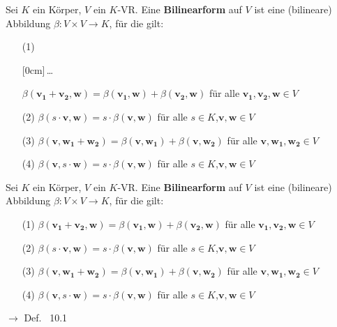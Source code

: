 \documentclass[11pt]{article}
\renewcommand{\cite}[1]{\par\bigskip\hfill{\color{gray}\tiny\(\to\) #1}}
\renewcommand{\vec}[1]{\mathbf{#1}}
\newcommand{\hide}[1]{\parbox{0cm}{\raisebox{-7pt}[0cm]{\dots}}\color{white}#1\color{black}}
\let\olddots\dots
\renewcommand{\dots}{\,\olddots\,}
\newenvironment{field}{}{\newpage}
\newif\ifnote
\newenvironment{note}{\notetrue}{\notefalse}
\newcommand{\localtag}{}
\newcommand{\globaltag}{}
\newcommand{\uuid}{}
\newcommand{\tags}[1]{
    \ifnote
        \renewcommand{\localtag}{#1}
    \else
        \renewcommand{\globaltag}{#1}
    \fi
    }
\newcommand{\xplain}[1]{\renewcommand{\uuid}{#1}}
\begin{document}

\tags{LinA-II-10-Skalarprodukte}
\begin{note}
    \xplain{6fc8a1b6-b98b-11ec-8422-0242ac120002}
    \tags{Def}
    \begin{field} %
    Sei \(K\) ein Körper, \(V\) ein \(K\)-VR. Eine \textbf{Bilinearform} auf \(V\) ist eine (bilineare) Abbildung  \(\beta\colon V\times V \to K\), für die gilt:
    \begin{itemize}
        \item[(1)] \hide{\(\beta(\vec{v_1} + \vec{v_2}, \vec{w}) = \beta(\vec{v_1}, \vec{w}) + \beta(\vec{v_2}, \vec{w})\) für alle \(\vec{v_1, v_2, w} \in V\)}
        \item[(2)] \(\beta(s\cdot\vec{v},\vec{w}) = s\cdot\beta(\vec{v},\vec{w})\) für alle \(s\in K\),\(\vec{v},\vec{w}\in V\)
        \item[(3)]\(\beta(\vec{v}, \vec{w_1} + \vec{w_2}) = \beta(\vec{v}, \vec{w_1}) + \beta(\vec{v}, \vec{w_2})\) für alle \(\vec{v, w_1, w_2} \in V\)
        \item[(4)]\(\beta(\vec{v},s\cdot\vec{w}) = s\cdot\beta(\vec{v},\vec{w})\) für alle \(s\in K\),\(\vec{v},\vec{w}\in V\)
    \end{itemize}
    \end{field}
    \begin{field} %
    Sei \(K\) ein Körper, \(V\) ein \(K\)-VR. Eine \textbf{Bilinearform} auf \(V\) ist eine (bilineare) Abbildung  \(\beta\colon V\times V \to K\), für die gilt:
    \begin{itemize}
        \item[(1)] \(\beta(\vec{v_1} + \vec{v_2}, \vec{w}) = \beta(\vec{v_1}, \vec{w}) + \beta(\vec{v_2}, \vec{w})\) für alle \(\vec{v_1, v_2, w} \in V\)
        \item[(2)] \(\beta(s\cdot\vec{v},\vec{w}) = s\cdot\beta(\vec{v},\vec{w})\) für alle \(s\in K\),\(\vec{v},\vec{w}\in V\)
        \item[(3)]\(\beta(\vec{v}, \vec{w_1} + \vec{w_2}) = \beta(\vec{v}, \vec{w_1}) + \beta(\vec{v}, \vec{w_2})\) für alle \(\vec{v, w_1, w_2} \in V\)
        \item[(4)]\(\beta(\vec{v},s\cdot\vec{w}) = s\cdot\beta(\vec{v},\vec{w})\) für alle \(s\in K\),\(\vec{v},\vec{w}\in V\)
    \end{itemize}
    \cite{Def. ~10.1}
    \end{field}
    \begin{field} %

\end{field}
\end{note}
\end{document}
